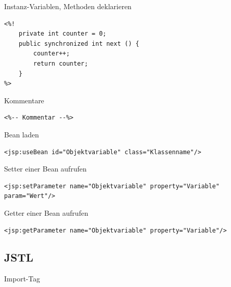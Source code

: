 \documentclass[11pt]{article}
\begin{document}
			Instanz-Variablen, Methoden deklarieren
			
			\begin{lstlisting}
<%! 
	private int counter = 0;
	public synchronized int next () {			
		counter++;
		return counter; 
	}
%>
			\end{lstlisting}
			
			Kommentare
			
			\begin{lstlisting}
<%-- Kommentar --%>
			\end{lstlisting}
			
			Bean laden
			
			\begin{lstlisting}
<jsp:useBean id="Objektvariable" class="Klassenname"/>
			\end{lstlisting}			
			
			Setter einer Bean aufrufen
			
			\begin{lstlisting}
<jsp:setParameter name="Objektvariable" property="Variable" param="Wert"/>			
			\end{lstlisting}
			
			Getter einer Bean aufrufen
			
			\begin{lstlisting}
<jsp:getParameter name="Objektvariable" property="Variable"/>
			\end{lstlisting}
			
			
		\subsection{JSTL}	
			
			Import-Tag
			
\end{document}
